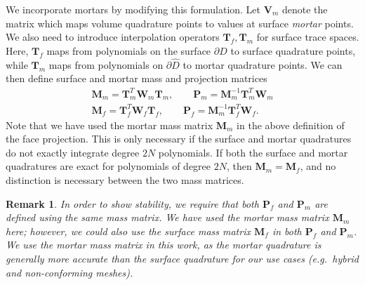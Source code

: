 \documentclass[review]{siamart0216}
\newtheorem*{remark}{Remark}
\renewcommand{\hat}{\widehat}
\begin{document}
We incorporate mortars by modifying this formulation.  Let $\bm{V}_m$ denote the matrix which maps volume quadrature points to values at surface \textit{mortar} points.  We also need to introduce interpolation operators $\bm{T}_f, \bm{T}_m$ for surface trace spaces.  Here, $\bm{T}_f$ maps from polynomials on the surface $\partial \hat{D}$ to surface quadrature points, while $\bm{T}_m$ maps from polynomials on $\partial \hat{D}$ to mortar quadrature points.  We can then define surface and mortar mass and projection matrices
\begin{align*}
\bm{M}_m = \bm{T}_m^T\bm{W}_m\bm{T}_m, \qquad \bm{P}_m = \bm{M}_m^{-1}\bm{T}_m^T\bm{W}_m\\
\bm{M}_f = \bm{T}_f^T\bm{W}_f\bm{T}_f, \qquad \bm{P}_f = \bm{M}_m^{-1}\bm{T}_f^T\bm{W}_f.
\end{align*}
Note that we have used the mortar mass matrix $\bm{M}_m$ in the above definition of the face projection.  This is only necessary if the surface and mortar quadratures do not exactly integrate degree $2N$ polynomials.  If both the surface and mortar quadratures are exact for polynomials of degree $2N$, then $\bm{M}_m = \bm{M}_f$, and no distinction is necessary between the two mass matrices.  

\begin{remark}
In order to show stability, we require that both $\bm{P}_f$ and $\bm{P}_m$ are defined using the same mass matrix.  We have used the mortar mass matrix $\bm{M}_m$ here; however, we could also use the surface mass matrix $\bm{M}_f$ in both $\bm{P}_f$ and $\bm{P}_m$.  We use the mortar mass matrix in this work, as the mortar quadrature is generally more accurate than the surface quadrature for our use cases (e.g.\ hybrid and non-conforming meshes).  
\end{remark}
\end{document}
